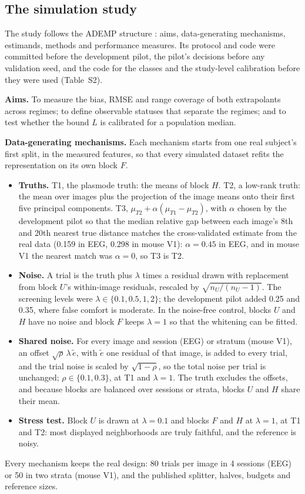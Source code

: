 \documentclass[11pt]{article}
\newcommand{\AlphaEeg}{0.45}
\newcommand{\AlphaMouse}{0}
\newcommand{\GapEeg}{0.159}
\newcommand{\GapMouse}{0.298}
\begin{document}
\subsection{The simulation study}
The study follows the ADEMP structure \citep{morris2019}: aims, data-generating mechanisms, estimands, methods and performance measures.
Its protocol and code were committed before the development pilot, the pilot's decisions before any validation seed, and the code for the classes and the study-level calibration before they were used (Table~S2).

\textbf{Aims.} To measure the bias, RMSE and range coverage of both extrapolants across regimes; to define observable statuses that separate the regimes; and to test whether the bound $L$ is calibrated for a population median.

\textbf{Data-generating mechanisms.} Each mechanism starts from one real subject's first split, in the measured features, so that every simulated dataset refits the representation on its own block $F$.
\begin{itemize}[leftmargin=*]
  \item \textbf{Truths.} T1, the plasmode truth: the means of block $H$.
  T2, a low-rank truth: the mean over images plus the projection of the image means onto their first five principal components.
  T3, $\mu_{T2}+\alpha(\mu_{T1}-\mu_{T2})$, with $\alpha$ chosen by the development pilot so that the median relative gap between each image's 8th and 20th nearest true distance matches the cross-validated estimate from the real data (\GapEeg{} in EEG, \GapMouse{} in mouse V1): $\alpha=\AlphaEeg$ in EEG, and in mouse V1 the nearest match was $\alpha=\AlphaMouse$, so T3 is T2.
  \item \textbf{Noise.} A trial is the truth plus $\lambda$ times a residual drawn with replacement from block $U$'s within-image residuals, rescaled by $\sqrt{n_U/(n_U-1)}$.
  The screening levels were $\lambda\in\{0.1,0.5,1,2\}$; the development pilot added 0.25 and 0.35, where false comfort is moderate.
  In the noise-free control, blocks $U$ and $H$ have no noise and block $F$ keeps $\lambda=1$ so that the whitening can be fitted.
  \item \textbf{Shared noise.} For every image and session (EEG) or stratum (mouse V1), an offset $\sqrt{\rho}\,\lambda\,\tilde e$, with $\tilde e$ one residual of that image, is added to every trial, and the trial noise is scaled by $\sqrt{1-\rho}$, so the total noise per trial is unchanged; $\rho\in\{0.1,0.3\}$, at T1 and $\lambda=1$.
  The truth excludes the offsets, and because blocks are balanced over sessions or strata, blocks $U$ and $H$ share their mean.
  \item \textbf{Stress test.} Block $U$ is drawn at $\lambda=0.1$ and blocks $F$ and $H$ at $\lambda=1$, at T1 and T2: most displayed neighborhoods are truly faithful, and the reference is noisy.
\end{itemize}
Every mechanism keeps the real design: 80 trials per image in 4 sessions (EEG) or 50 in two strata (mouse V1), and the published splitter, halves, budgets and reference sizes.
\end{document}
